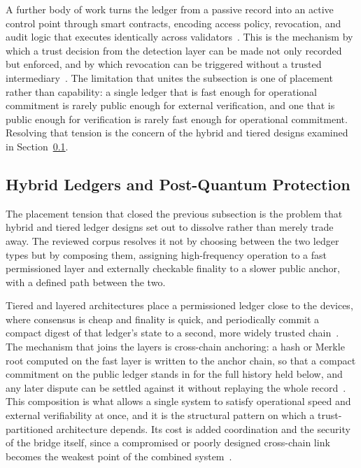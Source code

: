 A further body of work turns the ledger from a passive record into an active
control point through smart contracts, encoding access policy, revocation, and
audit logic that executes identically across validators~\cite{li2025hyperiiot,
dildar2025endtoend}. This is the mechanism by which a trust decision from the
detection layer can be made not only recorded but enforced, and by which
revocation can be triggered without a trusted intermediary~\cite{he2026bfldias,
xia2026ecroa}. The limitation that unites the subsection is one of placement
rather than capability: a single ledger that is fast enough for operational
commitment is rarely public enough for external verification, and one that is
public enough for verification is rarely fast enough for operational commitment.
Resolving that tension is the concern of the hybrid and tiered designs examined
in Section~\ref{subsec:soa-hybrid}.

\subsection{Hybrid Ledgers and Post-Quantum Protection}
\label{subsec:soa-hybrid}

The placement tension that closed the previous subsection is the problem that
hybrid and tiered ledger designs set out to dissolve rather than merely trade
away. The reviewed corpus resolves it not by choosing between the two ledger
types but by composing them, assigning high-frequency operation to a fast
permissioned layer and externally checkable finality to a slower public anchor,
with a defined path between the two.

Tiered and layered architectures place a permissioned ledger close to the
devices, where consensus is cheap and finality is quick, and periodically commit
a compact digest of that ledger's state to a second, more widely trusted
chain~\cite{ullah2025mbid, banitalebi2025edblsd}. The mechanism that joins the
layers is cross-chain anchoring: a hash or Merkle root computed on the fast layer
is written to the anchor chain, so that a compact commitment on the public ledger
stands in for the full history held below, and any later dispute can be settled
against it without replaying the whole record~\cite{oleszkiewicz2026cross,
correa2026decoupling}. This composition is what allows a single system to
satisfy operational speed and external verifiability at once, and it is the
structural pattern on which a trust-partitioned architecture depends. Its cost is
added coordination and the security of the bridge itself, since a compromised or
poorly designed cross-chain link becomes the weakest point of the combined
system~\cite{zhou2025bridgeguard, mukherjee2025double}.

